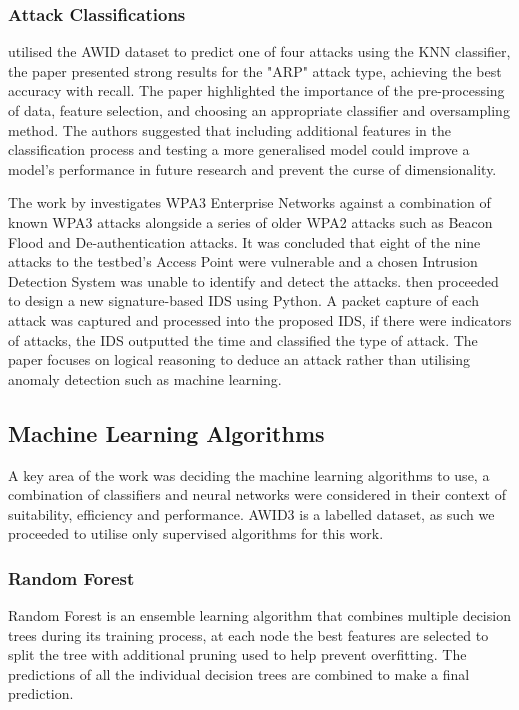 \subsubsection*{Attack Classifications}

\textcite{10.1007/978-3-030-98457-1_1} utilised the AWID dataset to predict one of four attacks using the KNN classifier, the paper presented strong results for the "ARP" attack type, achieving the best accuracy with recall. The paper highlighted the importance of the pre-processing of data, feature selection, and choosing an appropriate classifier and oversampling method. The authors suggested that including additional features in the classification process and testing a more generalised model could improve a model's performance in future research and prevent the curse of dimensionality.

\medskip
The work by \textcite{DBLP:journals/corr/abs-2110-04259} investigates WPA3 Enterprise Networks against a combination of known WPA3 attacks alongside a series of older WPA2 attacks such as Beacon Flood and De-authentication attacks. It was concluded that eight of the nine attacks to the testbed's Access Point were vulnerable and a chosen Intrusion Detection System was unable to identify and detect the attacks. \textcite{DBLP:journals/corr/abs-2110-04259} then proceeded to design a new signature-based IDS using Python. A packet capture of each attack was captured and processed into the proposed IDS, if there were indicators of attacks, the IDS outputted the time and classified the type of attack. The paper focuses on logical reasoning to deduce an attack rather than utilising anomaly detection such as machine learning.
 
\subsection{Machine Learning Algorithms}

A key area of the work was deciding the machine learning algorithms to use, a combination of classifiers and neural networks were considered in their context of suitability, efficiency and performance. AWID3 is a labelled dataset, as such we proceeded to utilise only supervised algorithms for this work.

\subsubsection{Random Forest}

Random Forest is an ensemble learning algorithm that combines multiple decision trees during its training process, at each node the best features are selected to split the tree with additional pruning used to help prevent overfitting. The predictions of all the individual decision trees are combined to make a final prediction.

